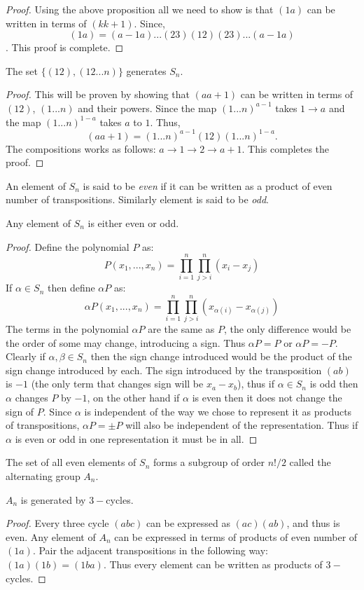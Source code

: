 \begin{proof}
  Using the above proposition all we need to show is that $(1a)$ can be written in terms of $(kk+1)$. Since,
  \[(1a) = (a-1a)...(23)(12)(23)...(a-1a)\].
  This proof is complete.
\end{proof}
\begin{proposition}
  The set $\{(12), (12...n)\}$ generates $S_n$.
\end{proposition}
\begin{proof}
  This will be proven by showing that $(aa+1)$ can be written in terms of $(12)$, $(1...n)$ and their powers. Since the map $(1...n)^{a-1}$ takes $1\to a$ and the map $(1...n)^{1-a}$ takes $a$ to $1$. Thus,
  \[(aa+1) = (1...n)^{a-1}(12)(1...n)^{1-a}.\]
  The compositions works as follows: $a\to 1 \to 2 \to a+1$. This completes the proof.
\end{proof}
\begin{definition}
  An element of $S_n$ is said to be \textit{even} if it can be written as a product of even number of transpositions. Similarly element is said to be \textit{odd}. 
\end{definition}
\begin{proposition}
  Any element of $S_n$ is either even or odd.
\end{proposition}
\begin{proof}
 Define the polynomial $P$ as:
 \[P(x_1,...,x_n) = \prod_{i=1}^n \prod_{j>i}^n (x_i - x_j)\]
If $\alpha\in S_n$ then define $\alpha P$ as:
\[\alpha P(x_1,...,x_n) = \prod_{i=1}^n \prod_{j>i}^n (x_{\alpha(i)} - x_{\alpha(j)})\]
The terms in the polynomial $\alpha P$ are the same as $P$, the only difference would be the order of some may change, introducing a sign. Thus $\alpha P = P$ or $\alpha P = -P$. Clearly if $\alpha,\beta\in S_n$ then the sign change introduced would be the product of the sign change introduced by each. The sign introduced by the transposition $(ab)$ is $-1$ (the only term that changes sign will be $x_a-x_b$), thus if $\alpha\in S_n$ is odd then $\alpha$ changes $P$ by $-1$, on the other hand if $\alpha$ is even then it does not change the sign of $P$. Since $\alpha$ is independent of the way we chose to represent it as products of transpositions, $\alpha P = \pm P$ will also be independent of the representation. Thus if $\alpha$ is even or odd in one representation it must be in all.
\end{proof}
\begin{definition}
  The set of all even elements of $S_n$ forms a subgroup of order $n!/2$ called the alternating group $A_n$.
\end{definition}
\begin{proposition}
  $A_n$ is generated by $3-$cycles.
\end{proposition}
\begin{proof}
  Every three cycle $(abc)$ can be expressed as $(ac)(ab)$, and thus is even. Any element of $A_n$ can be expressed in terms of products of even number of $(1a)$. Pair the adjacent transpositions in the following way: $(1a)(1b) = (1ba)$. Thus every element can be written as products of $3-$cycles. 
\end{proof}
